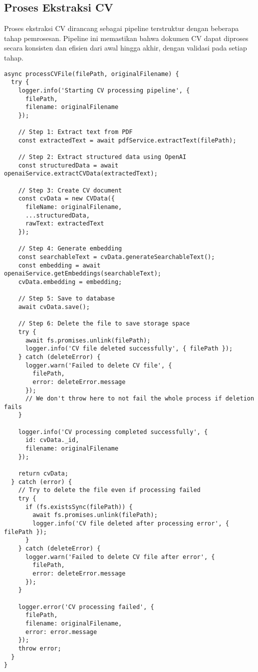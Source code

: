 \subsection{Proses Ekstraksi CV}
Proses ekstraksi CV dirancang sebagai pipeline terstruktur dengan beberapa tahap pemrosesan. Pipeline ini memastikan bahwa dokumen CV dapat diproses secara konsisten dan efisien dari awal hingga akhir, dengan validasi pada setiap tahap.

\begin{verbatim}
async processCVFile(filePath, originalFilename) {
  try {
    logger.info('Starting CV processing pipeline', { 
      filePath,
      filename: originalFilename
    });
    
    // Step 1: Extract text from PDF
    const extractedText = await pdfService.extractText(filePath);
    
    // Step 2: Extract structured data using OpenAI
    const structuredData = await openaiService.extractCVData(extractedText);
    
    // Step 3: Create CV document
    const cvData = new CVData({
      fileName: originalFilename,
      ...structuredData,
      rawText: extractedText
    });
    
    // Step 4: Generate embedding
    const searchableText = cvData.generateSearchableText();
    const embedding = await openaiService.getEmbeddings(searchableText);
    cvData.embedding = embedding;
    
    // Step 5: Save to database
    await cvData.save();
    
    // Step 6: Delete the file to save storage space
    try {
      await fs.promises.unlink(filePath);
      logger.info('CV file deleted successfully', { filePath });
    } catch (deleteError) {
      logger.warn('Failed to delete CV file', { 
        filePath, 
        error: deleteError.message 
      });
      // We don't throw here to not fail the whole process if deletion fails
    }
    
    logger.info('CV processing completed successfully', { 
      id: cvData._id,
      filename: originalFilename
    });
    
    return cvData;
  } catch (error) {
    // Try to delete the file even if processing failed
    try {
      if (fs.existsSync(filePath)) {
        await fs.promises.unlink(filePath);
        logger.info('CV file deleted after processing error', { filePath });
      }
    } catch (deleteError) {
      logger.warn('Failed to delete CV file after error', { 
        filePath, 
        error: deleteError.message 
      });
    }
    
    logger.error('CV processing failed', { 
      filePath,
      filename: originalFilename,
      error: error.message
    });
    throw error;
  }
}
\end{verbatim}

